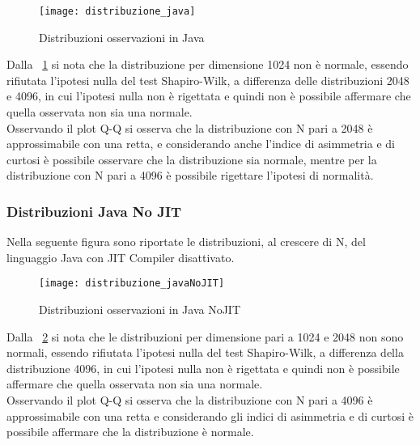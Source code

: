 \begin{figure}[!htbp]
  \texttt{[image: distribuzione\_java]}
  \caption{Distribuzioni osservazioni in Java}
  \label{prodottomatrici_distribuzione_java}
\end{figure}

Dalla \figurename~\ref{prodottomatrici_distribuzione_java} si nota
che la distribuzione per dimensione 1024 non è normale, essendo rifiutata
l'ipotesi nulla del test Shapiro-Wilk, a differenza delle distribuzioni 2048 e
4096, in cui l'ipotesi nulla non è rigettata e quindi non è possibile affermare
che quella osservata non sia una normale.\\
Osservando il plot Q-Q si osserva che la distribuzione con N pari a 2048
è approssimabile con una retta, e considerando anche l'indice di asimmetria
e di curtosi è possibile osservare che la distribuzione sia normale, mentre
per la distribuzione con N pari a 4096 è possibile rigettare l'ipotesi di normalità.\\

\clearpage
\subsubsection{Distribuzioni Java No JIT}
Nella seguente figura sono riportate le distribuzioni, al crescere di N, del
linguaggio Java con JIT Compiler disattivato.

\begin{figure}[!htbp]
  \texttt{[image: distribuzione\_javaNoJIT]}
  \caption{Distribuzioni osservazioni in Java NoJIT}
  \label{prodottomatrici_distribuzione_javaNoJIT}
\end{figure}

Dalla \figurename~\ref{prodottomatrici_distribuzione_javaNoJIT} si nota
che le distribuzioni per dimensione pari a 1024 e 2048 non sono normali, essendo
rifiutata l'ipotesi nulla del test Shapiro-Wilk, a differenza della distribuzione
4096, in cui l'ipotesi nulla non è rigettata e quindi non è possibile affermare
che quella osservata non sia una normale.\\
Osservando il plot Q-Q si osserva che la distribuzione con N pari a 4096 è
approssimabile con una retta e considerando gli indici di asimmetria e di
curtosi è possibile affermare che la distribuzione è normale.\\

\clearpage
